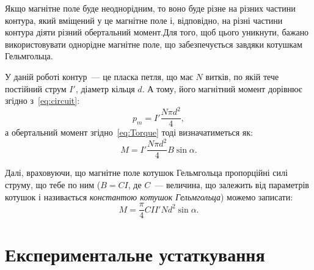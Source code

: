 \documentclass{LabWork}
\begin{document}
Якщо магнітне поле буде неоднорідним, то воно буде різне на різних частини  контура, який вміщений у це магнітне поле і, відповідно, на різні частини контура діяти різний обертальний момент.Для того, щоб цього уникнути, бажано використовувати однорідне магнітне поле, що забезпечується завдяки котушкам Гельмгольца.

У даній роботі контур~--- це пласка петля, що має $N$ витків, по якій тече постійний струм $I'$, діаметр кільця $d$. А тому, його магнітний момент дорівнює згідно з~\eqref{eq:circuit}:
\begin{equation*}\label{eq:pmE}
	p_m = I'\frac{N \pi d^2}{4},
\end{equation*}
а обертальний момент згідно~\eqref{eq:Torque} тоді визначатиметься як:
\begin{equation*}\label{}
	M = I'\frac{N \pi d^2}{4} B\sin\alpha.
\end{equation*}

Далі, враховуючи, що магнітне поле котушок Гельмгольца пропорційні силі струму, що тебе по ним ($B = CI$, де $C$~--- величина, що залежить від параметрів котушок і називається \emph{константою котушок Гельмгольца}) можемо записати:
\begin{equation}\label{eq:TorqueE}
	M = \frac{\pi}{4} CII'Nd^2\sin\alpha.
\end{equation}

\section{Експериментальне устаткування}
\end{document}
